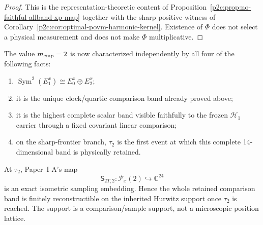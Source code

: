 \documentclass[12pt,a4paper]{article}
\begin{document}
\begin{proof}
This is the representation-theoretic content of
Proposition~\ref{p2c:prop:no-faithful-allband-xp-map} together with the sharp
positive witness of Corollary~\ref{p2c:cor:optimal-povm-harmonic-kernel}.
Existence of $\Phi$ does not select a physical measurement and does not make
$\Phi$ multiplicative.
\end{proof}

\begin{corollary}
\label{p4:cor:v260-degree-two-fourfold-characterization}
The value $m_{\rm cmp}=2$ is now characterized independently by all four of
the following facts:
\begin{enumerate}[label=(\roman*),leftmargin=2.1em]
\item $\operatorname{Sym}^2(E_1^x)\cong E_0^x\oplus E_2^x$;
\item it is the unique clock/quartic comparison band already proved above;
\item it is the highest complete scalar band visible faithfully to the frozen
      $\mathcal H_1$ carrier through a fixed covariant linear comparison;
\item on the sharp-frontier branch, $\tau_2$ is the first event at which this
      complete 14-dimensional band is physically retained.
\end{enumerate}
At $\tau_2$, Paper~I-A's map
\[
 \mathsf S_{2T,2}:\mathcal P_x(2)\hookrightarrow\mathbb C^{24}
\]
is an exact isometric sampling embedding.  Hence the whole retained
comparison band is finitely reconstructible on the inherited Hurwitz support
once $\tau_2$ is reached.  The support is a comparison/sample support, not a
microscopic position lattice.
\end{corollary}
\end{document}
